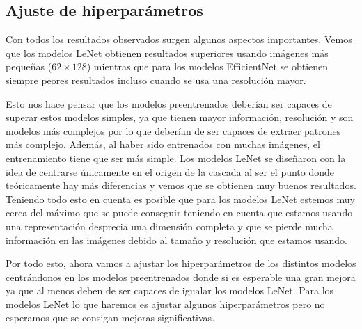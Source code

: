 \documentclass[a4paper,12pt,twoside,titlepage]{article}
\begin{document}
\subsection{Ajuste de hiperparámetros}

Con todos los resultados observados surgen algunos aspectos importantes. Vemos que los modelos LeNet obtienen resultados superiores usando imágenes más pequeñas ($62\times 128$) mientras que para los modelos EfficientNet se obtienen siempre peores resultados incluso cuando se usa una resolución mayor.

Esto nos hace pensar que los modelos preentrenados deberían ser capaces de superar estos modelos simples, ya que tienen mayor información, resolución y son modelos más complejos por lo que deberían de ser capaces de extraer patrones más complejo. Además, al haber sido entrenados con muchas imágenes, el entrenamiento tiene que ser más simple. Los modelos LeNet se diseñaron con la idea de centrarse únicamente en el origen de la cascada al ser el punto donde teóricamente hay más diferencias y vemos que se obtienen muy buenos resultados. Teniendo todo esto en cuenta es posible que para los modelos LeNet estemos muy cerca del máximo que se puede conseguir teniendo en cuenta que estamos usando una representación desprecia una dimensión completa y que se pierde mucha información en las imágenes debido al tamaño y resolución que estamos usando.

Por todo esto, ahora vamos a ajustar los hiperparámetros de los distintos modelos centrándonos en los modelos preentrenados donde si es esperable una gran mejora ya que al menos deben de ser capaces de igualar los modelos LeNet. Para los modelos LeNet lo que haremos es ajustar algunos hiperparámetros pero no esperamos que se consigan mejoras significativas.

\end{document}
